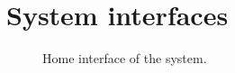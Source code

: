 \chapter{System interfaces}\label{apendixd}

\begin{figure}[ht!]
   \captionsetup{font=footnotesize}
   \centering
   \hspace{0.01\linewidth}
   \caption{Home interface of the system.
   }
   \label{fig:home} 
\end{figure}

